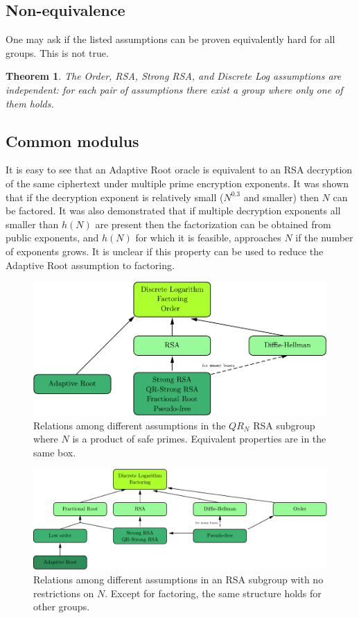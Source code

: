 \documentclass[a4paper]{article}
\newtheorem{theorem}{Theorem}
\begin{document}
\subsection{Non-equivalence}

One may ask if the listed assumptions can be proven equivalently hard for all groups. This is not true.
\begin{theorem}\cite{LM71,DBLP:conf/tcc/Rivest04} The Order, RSA, Strong RSA, and Discrete Log assumptions are independent: for each pair of assumptions there exist a group where only one of them holds.
\end{theorem}

\subsection{Common modulus}
It is easy to see that an Adaptive Root oracle is equivalent to an RSA decryption of the same ciphertext under multiple prime encryption exponents. It was shown that if the decryption exponent is relatively small ($N^{0.3}$ and smaller) then $N$ can be factored. It was also demonstrated that if multiple decryption exponents all smaller than $h(N)$ are present then the factorization can be obtained from public exponents, and $h(N)$ for which it is feasible, approaches $N$ if the number of exponents grows. It is unclear if this property can be used to reduce the Adaptive Root assumption to factoring.


\begin{figure}
    \centering
    \includegraphics[scale=0.7]{pics/RSA-QR.pdf}
    \caption{Relations among different assumptions in the $QR_N$ RSA subgroup where $N$ is a product of safe primes. Equivalent properties are in the same box.}
    \label{fig:rsa}
\end{figure}

\begin{figure}
    \centering
    \includegraphics[scale=0.7]{pics/RSA-reg.pdf}
    \caption{Relations among different assumptions in an RSA subgroup with no restrictions on $N$. Except for factoring, the same structure holds for other groups.}
    \label{fig:rsa}
\end{figure}
\end{document}
